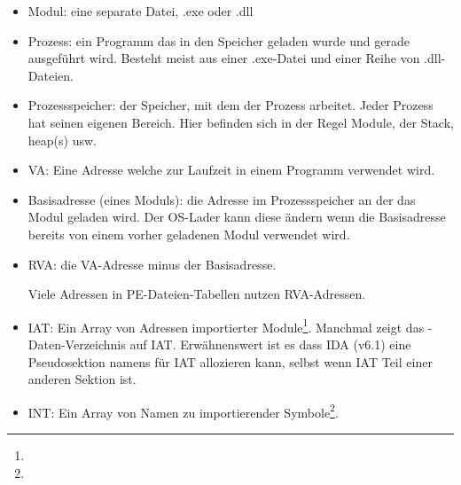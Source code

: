 \begin{itemize}
\item Modul: eine separate Datei, .exe oder .dll

\item Prozess: ein Programm das in den Speicher geladen wurde und gerade ausgeführt
wird. Besteht meist aus einer .exe-Datei und einer Reihe von .dll-Dateien.

\item Prozessspeicher: der Speicher, mit dem der Prozess arbeitet. Jeder Prozess
hat seinen eigenen Bereich. Hier befinden sich in der Regel Module, der Stack,
\gls{heap}(s) usw.

\item \ac{VA}: Eine Adresse welche zur Laufzeit in einem Programm verwendet wird.

\item Basisadresse (eines Moduls): die Adresse im Prozessspeicher an der das Modul
geladen wird. Der \ac{OS}-Lader kann diese ändern wenn die Basisadresse bereits
von einem vorher geladenen Modul verwendet wird.

\item \ac{RVA}: die \ac{VA}-Adresse minus der Basisadresse.

Viele Adressen in PE-Dateien-Tabellen nutzen \ac{RVA}-Adressen.


\item \ac{IAT}: Ein Array von Adressen importierter Module\footnote{\PietrekPE}. 
Manchmal zeigt das -Daten-Verzeichnis auf \ac{IAT}.
\label{IDA_idata}
Erwähnenswert ist es dass \ac{IDA} (v6.1) eine Pseudosektion namens 
für \ac{IAT} allozieren kann, selbst wenn \ac{IAT} Teil einer anderen Sektion ist.

\item \ac{INT}: Ein Array von Namen zu importierender Symbole\footnote{\PietrekPE}.
\end{itemize}

